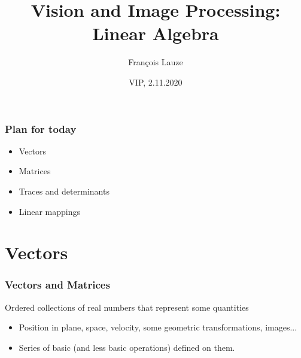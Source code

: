 \documentclass[8pt,dvipsnames]{beamer}
\title{Vision and Image Processing:\\ Linear Algebra}
\author[F.~Lauze] %
{Fran{\c c}ois Lauze}
\institute[DIKU] %
{
  Department of Computer Science\\
  University of Copenhagen
}
\date[2020-21 B2]{VIP, 2.11.2020}
\begin{document}
\maketitle








 
  

\begin{frame}
  \frametitle{Plan for today}
  \begin{itemize}
  \item Vectors
  \item Matrices
  \item Traces and determinants
  \item Linear mappings
  \end{itemize}
\end{frame}


\section{Vectors}

\begin{frame}
  \frametitle{Vectors and Matrices}
  Ordered collections of real numbers that represent some quantities
  \begin{itemize}
  \item Position in plane, space, velocity, some geometric transformations, images...
  \item Series of basic (and less basic operations)  defined on them.
  \end{itemize}
\end{frame}
\end{document}
